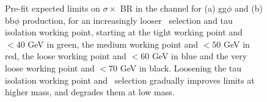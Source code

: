 \begin{figure}[h!]
\begin{center}
\end{center}
\caption[Pre-fit expected limits on $\sigma\times$ BR in the \etau
channel for gg$\phi$ and bb$\phi$ production for an increasingly
looser \mT~selection and tau isolation working point.]{Pre-fit expected limits on $\sigma \times$ BR in the \etau channel for (a) gg$\phi$ and
(b) bb$\phi$ production, for an increasingly looser \mT~selection and tau isolation working point, starting
at the tight working point and \mT$<40$ GeV in green, the medium working point and \mT$<50$ GeV in red,
the loose working point and \mT$<60$ GeV in blue and the very loose working point and \mT$<70$ GeV in black. Loosening
the tau isolation working point and \mT~selection gradually improves limits at higher mass, and
degrades them at low mass.}
\label{fig:mssm_gradcuts_et}
\end{figure}
